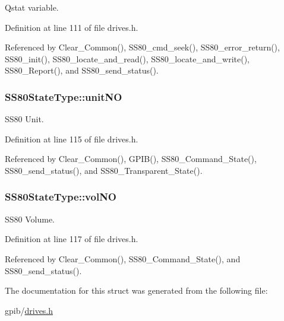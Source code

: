 Qstat variable. 



Definition at line 111 of file drives.\+h.



Referenced by Clear\+\_\+\+Common(), S\+S80\+\_\+cmd\+\_\+seek(), S\+S80\+\_\+error\+\_\+return(), S\+S80\+\_\+init(), S\+S80\+\_\+locate\+\_\+and\+\_\+read(), S\+S80\+\_\+locate\+\_\+and\+\_\+write(), S\+S80\+\_\+\+Report(), and S\+S80\+\_\+send\+\_\+status().

\subsubsection[{\texorpdfstring{unit\+NO}{unitNO}}]{ S\+S80\+State\+Type\+::unit\+NO}\hypertarget{structSS80StateType_ad2b3cd5353f5650df931520a39b385e7}{}\label{structSS80StateType_ad2b3cd5353f5650df931520a39b385e7}


S\+S80 Unit. 



Definition at line 115 of file drives.\+h.



Referenced by Clear\+\_\+\+Common(), G\+P\+I\+B(), S\+S80\+\_\+\+Command\+\_\+\+State(), S\+S80\+\_\+send\+\_\+status(), and S\+S80\+\_\+\+Transparent\+\_\+\+State().

\subsubsection[{\texorpdfstring{vol\+NO}{volNO}}]{ S\+S80\+State\+Type\+::vol\+NO}\hypertarget{structSS80StateType_ac197866db7677ec4bf9ad5e29e4a58a3}{}\label{structSS80StateType_ac197866db7677ec4bf9ad5e29e4a58a3}


S\+S80 Volume. 



Definition at line 117 of file drives.\+h.



Referenced by Clear\+\_\+\+Common(), S\+S80\+\_\+\+Command\+\_\+\+State(), and S\+S80\+\_\+send\+\_\+status().



The documentation for this struct was generated from the following file\+:\begin{DoxyCompactItemize}
\item 
gpib/\hyperlink{drives_8h}{drives.\+h}\end{DoxyCompactItemize}
